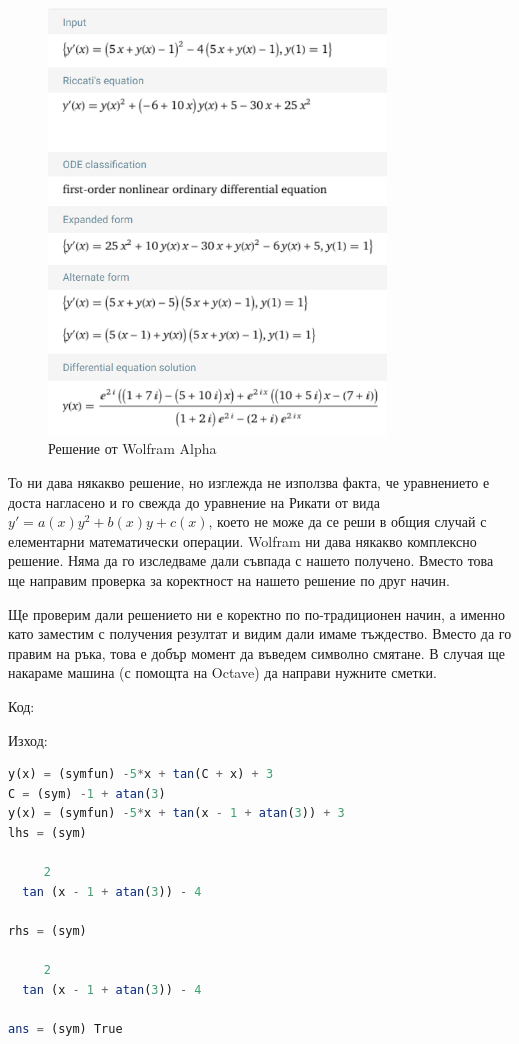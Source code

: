 \documentclass{scrartcl}
\begin{document}
\begin{figure}[H]
    \centering
    \includegraphics[width=0.8\textwidth]{wolfram_sol.png}
    \caption{Решение от Wolfram Alpha}
    \label{fig:wolfram_sol}
\end{figure}

\begin{FlushLeft}
То ни дава някакво решение, но изглежда не използва факта, че уравнението е доста нагласено и го свежда до уравнение на Рикати от вида $y' = a(x)y^2 + b(x)y + c(x)$, което не може да се реши в общия случай с елементарни математически операции. Wolfram ни дава някакво комплексно решение. Няма да го изследваме дали съвпада с нашето получено. Вместо това ще направим проверка за коректност на нашето решение по друг начин.

Ще проверим дали решението ни е коректно по по-традиционен начин, а именно като заместим с получения резултат и видим дали имаме тъждество. Вместо да го правим на ръка, това е добър момент да въведем символно смятане. В случая ще накараме машина (с помощта на Octave) да направи нужните сметки.

\end{FlushLeft}

Код:


Изход:
\begin{lstlisting}[language=Octave]
y(x) = (symfun) -5*x + tan(C + x) + 3
C = (sym) -1 + atan(3)
y(x) = (symfun) -5*x + tan(x - 1 + atan(3)) + 3
lhs = (sym)

     2                     
  tan (x - 1 + atan(3)) - 4

rhs = (sym)

     2                     
  tan (x - 1 + atan(3)) - 4

ans = (sym) True
\end{lstlisting}
\end{document}

